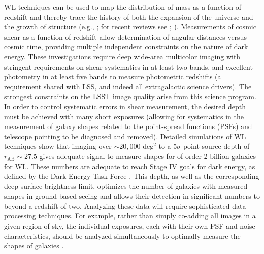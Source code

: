 WL techniques can be used to map the distribution of
mass as a function of redshift and thereby trace the history of both
the expansion of the universe and the growth of structure (e.g., \citealt{1999ApJ...514L..65H};
for recent reviews see \citealt{2015RPPh...78h6901K}; \citealt{2018ARA&A..56..393M}).  Measurements of cosmic shear as a function of
redshift allow determination of angular distances versus cosmic time,
providing multiple independent constraints on the nature of dark
energy.  These investigations require deep wide-area multicolor
imaging with stringent requirements on shear systematics in at least
two bands, and excellent photometry in at least five bands to measure
photometric redshifts (a requirement shared with LSS, and indeed all
extragalactic science drivers). The strongest constraints on the LSST
image quality arise from this science program. In order to control
systematic errors in shear measurement, the desired depth must be
achieved with many short exposures (allowing for systematics in the
measurement of galaxy shapes related
to the point-spread functions (PSFs) and telescope pointing to be diagnosed and removed). Detailed simulations of
WL techniques show that imaging over $\sim20,000$ deg$^2$ to
a 5$\sigma$ point-source depth of $r_\mathrm{AB} \sim 27.5$ gives adequate
signal to measure shapes for of order 2 billion galaxies for WL.
These numbers are adequate to reach
Stage IV goals for dark energy, as defined by the Dark Energy Task
Force \citep{2006astro.ph..9591A}.
This
depth, as well as the corresponding deep surface brightness limit,
optimizes the number of galaxies with measured shapes in ground-based
seeing and allows their detection in significant numbers to beyond a
redshift of two.  Analyzing these data will
require sophisticated data processing techniques.  For example, rather
than simply co-adding all images in a given region of sky, the
individual exposures, each with their own PSF and noise
characteristics,  should be analyzed simultaneously to optimally
measure the shapes of galaxies \citep{2008ASPC..394..107T,2011PASP..123..596J}.

